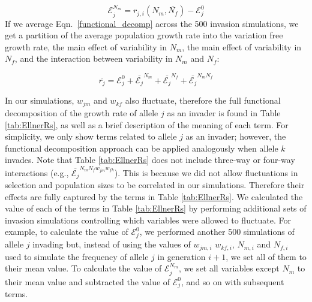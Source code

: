 \begin{refsection}
\begin{equation}
  \mathcal{E}_{j}^{N_{m}} = r_{j,i}(N_{m},\overline{N_{f}}) - \mathcal{E}_{j}^{0}
\end{equation}
If we average Eqn.~\ref{functional_decomp} across the 500 invasion simulations, we get a partition of the average population growth rate into the variation free growth rate, the main effect of variability in $N_{m}$, the main effect of variability in $N_{f}$, and the interaction between variability in $N_{m}$ and $N_{f}$:

\begin{equation}
    \overline{r_{j}}= \mathcal{E}_{j}^{0} + \overline{\mathcal{E}_{j}}^{N_{m}}+ \overline{\mathcal{E}_{j}}^{N_{f}}+ \overline{\mathcal{E}_{j}}^{N_{m}N_{f}}
   \label{functional_decomp_2}
\end{equation}

In our simulations, $w_{jm}$ and $w_{kf}$ also fluctuate, therefore the full functional decomposition of the growth rate of allele $j$ as an invader is found in Table \ref{tab:EllnerRs}, as well as a brief description of the meaning of each term. For simplicity, we only show terms related to allele $j$ as an invader; however, the functional decomposition approach can be applied analogously when allele $k$ invades. Note that Table \ref{tab:EllnerRs} does not include three-way or four-way interactions (e.g., $\overline{\mathcal{E}_{j}}^{N_{m}N_{f}w_{jm}w_{fk}}$). This is because we did not allow fluctuations in selection and population sizes to be correlated in our simulations. Therefore their effects are fully captured by the terms in Table \ref{tab:EllnerRs}. We calculated the value of each of the terms in Table \ref{tab:EllnerRs} by performing additional sets of invasion simulations controlling which variables were allowed to fluctuate. For example, to calculate the value of $\mathcal{E}_{j}^{0}$, we performed another 500 simulations of allele $j$ invading but, instead of using the values of $w_{jm,i}$ $w_{kf,i}$, $N_{m,i}$ and $N_{f,i}$ used to simulate the frequency of allele $j$ in generation $i+1$, we set all of them to their mean value. To calculate the value of $\mathcal{E}_{j}^{N_{m}}$, we set all variables except $N_{m}$ to their mean value and subtracted the value of $\mathcal{E}_{j}^{0}$, and so on with subsequent terms.



\end{refsection}
